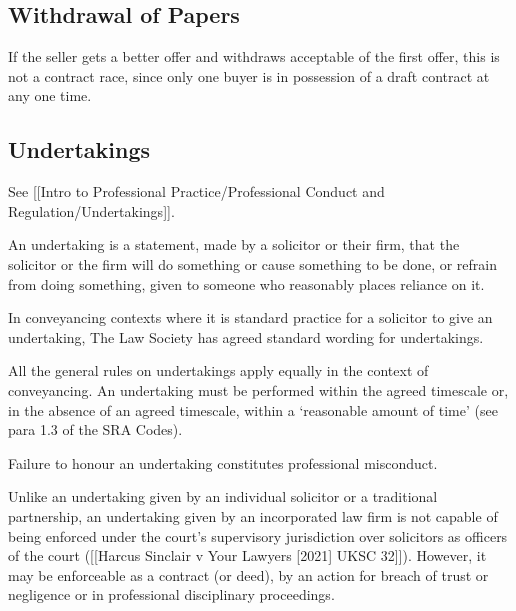 \documentclass[
]{article}
\newenvironment{Shaded}{}{}
\newcommand{\NormalTok}[1]{#1}
\begin{document}
\hypertarget{withdrawal-of-papers}{%
\subsection{Withdrawal of Papers}\label{withdrawal-of-papers}}

If the seller gets a better offer and withdraws acceptable of the first
offer, this is not a contract race, since only one buyer is in
possession of a draft contract at any one time.

\hypertarget{undertakings}{%
\subsection{Undertakings}\label{undertakings}}

See {[}{[}Intro to Professional Practice/Professional Conduct and
Regulation/Undertakings{]}{]}.

\begin{Shaded}
\begin{Highlighting}[]
\NormalTok{An undertaking is a statement, made by a solicitor or their firm, that the solicitor or the firm will do something or cause something to be done, or refrain from doing something, given to someone who reasonably places reliance on it.}
\end{Highlighting}
\end{Shaded}

In conveyancing contexts where it is standard practice for a solicitor
to give an undertaking, The Law Society has agreed standard wording for
undertakings.

All the general rules on undertakings apply equally in the context of
conveyancing. An undertaking must be performed within the agreed
timescale or, in the absence of an agreed timescale, within a
`reasonable amount of time' (see para 1.3 of the SRA Codes).

Failure to honour an undertaking constitutes professional misconduct.

\begin{Shaded}
\begin{Highlighting}[]
\NormalTok{Unlike an undertaking given by an}
\NormalTok{individual solicitor or a traditional partnership, an undertaking given by an incorporated law firm is not capable of being enforced under the court’s supervisory jurisdiction over solicitors as officers of the court ([[Harcus Sinclair v Your Lawyers [2021] UKSC 32]]). However, it may be enforceable as a contract (or deed), by an action for breach of trust or negligence or in professional disciplinary proceedings.}
\end{Highlighting}
\end{Shaded}
\end{document}
